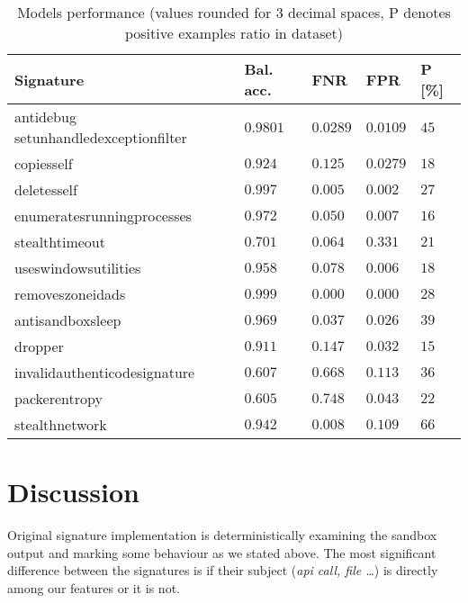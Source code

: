 \begin{table}[h]
  \centering
  \caption{Models performance (values rounded for 3 decimal spaces, P denotes positive examples ratio in dataset)}
  \begin{tabular}{lllll}
      \toprule
      \textbf{Signature} &
      \textbf{Bal. acc.} &
      \textbf{FNR} &
      \textbf{FPR} &
      \textbf{P [\%]}
      \\
      \midrule
      antidebug setunhandledexceptionfilter & $0.9801$ & $0.0289$ & $0.0109$ & $45$ \\
      \midrule
      copiesself & $0.924$ & $0.125$ & $0.0279$ & $18$ \\
      \midrule
      deletesself & $0.997$ & $0.005$ & $0.002$ & $27$ \\
      \midrule
      enumeratesrunningprocesses & $0.972$ & $0.050$ & $0.007$ & $16$ \\
      \midrule
      stealthtimeout & $0.701$ & $0.064$ & $0.331$ & $21$ \\
      \midrule
      useswindowsutilities & $0.958$ & $0.078$ & $0.006$ & $18$ \\
      \midrule
      removeszoneidads & $0.999$ & $0.000$ & $0.000$ & $28$ \\
      \midrule[0.3pt]
      \midrule[0.3pt]
      antisandboxsleep & $0.969$ & $0.037$ & $0.026$ & $39$ \\
      \midrule
      dropper & $0.911$ & $0.147$ & $0.032$ & $15$ \\
      \midrule
      invalidauthenticodesignature & $0.607$ & $0.668$ & $0.113$ & $36$ \\
      \midrule
      packerentropy & $0.605$ & $0.748$ & $0.043$ & $22$ \\
      \midrule
      stealthnetwork & $0.942$ & $0.008$ & $0.109$ & $66$ \\
      \bottomrule
  \end{tabular}
  \label{tab:models_res}
\end{table}

\section{Discussion}
Original signature implementation is deterministically examining the sandbox output and marking some behaviour as we stated above. The most significant difference between the signatures is if their subject (\emph{api call, file \dots}) is directly among our features or it is not. 

